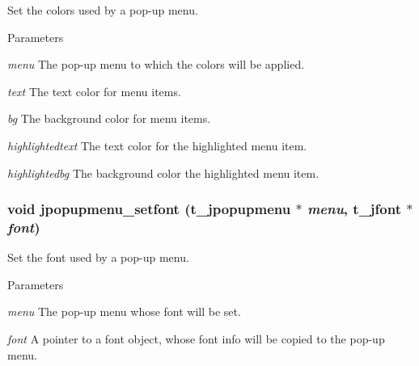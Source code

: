 Set the colors used by a pop-\/up menu. 
\begin{DoxyParams}{Parameters}
\item[{\em menu}]The pop-\/up menu to which the colors will be applied. \item[{\em text}]The text color for menu items. \item[{\em bg}]The background color for menu items. \item[{\em highlightedtext}]The text color for the highlighted menu item. \item[{\em highlightedbg}]The background color the highlighted menu item. \end{DoxyParams}
\hypertarget{group__jpopupmenu_gaf4a1c2ad6943b5095cac1932f9c39972}{
\subsubsection[{jpopupmenu\_\-setfont}]{\setlength{\rightskip}{0pt plus 5cm}void jpopupmenu\_\-setfont ({\bf t\_\-jpopupmenu} $\ast$ {\em menu}, \/  {\bf t\_\-jfont} $\ast$ {\em font})}}
\label{group__jpopupmenu_gaf4a1c2ad6943b5095cac1932f9c39972}


Set the font used by a pop-\/up menu. 
\begin{DoxyParams}{Parameters}
\item[{\em menu}]The pop-\/up menu whose font will be set. \item[{\em font}]A pointer to a font object, whose font info will be copied to the pop-\/up menu. \end{DoxyParams}
